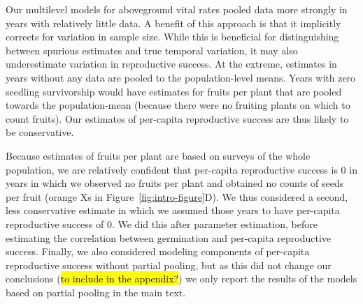 \documentclass[12pt, oneside]{article}   	%
\begin{document}
Our multilevel models for aboveground vital rates pooled data more strongly in years with relatively little data. A benefit of this approach is that it implicitly corrects for variation in sample size. While this is beneficial for distinguishing between spurious estimates and true temporal variation, it may also underestimate variation in reproductive success. At the extreme, estimates in years without any data are pooled to the population-level means. Years with zero seedling survivorship would have estimates for fruits per plant that are pooled towards the population-mean (because there were no fruiting plants on which to count fruits). Our estimates of per-capita reproductive success are thus likely to be conservative. 

Because estimates of fruits per plant are based on surveys of the whole population, we are relatively confident that per-capita reproductive success is 0 in years in which we observed no fruits per plant and obtained no counts of seeds per fruit (orange Xs in Figure~\ref{fig:intro-figure}D). We thus considered a second, less conservative estimate in which we assumed those years to have per-capita reproductive success of 0. We did this after parameter estimation, before estimating the correlation between germination and per-capita reproductive success. Finally, we also considered modeling components of per-capita reproductive success without partial pooling, but as this did not change our conclusions (\hl{to include in the appendix?}) we only report the results of the models based on partial pooling in the main text.  


\end{document}
